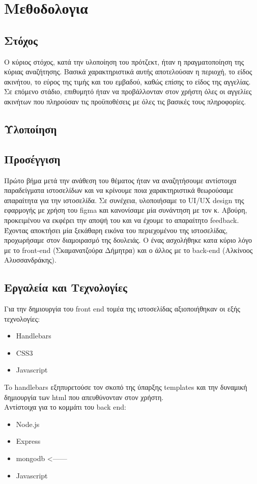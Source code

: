 \documentclass{acmart}
\begin{document}
\section{Μεθοδολογια}
\subsection{Στόχος}
Ο κύριος στόχος, κατά την υλοποίηση του πρότζεκτ, ήταν η πραγματοποίηση της κύριας αναζήτησης. Βασικά χαρακτηριστικά αυτής αποτελούσαν η περιοχή, το είδος ακινήτου, το εύρος της τιμής και του εμβαδού, καθώς επίσης το είδος της αγγελίας. Σε επόμενο στάδιο, επιθυμητό ήταν να προβάλλονταν στον χρήστη όλες οι αγγελίες ακινήτων που πληρούσαν τις προϋποθέσεις με όλες τις βασικές τους πληροφορίες.

\subsection{Υλοποίηση}
\subsection*{Προσέγγιση}
Πρώτο βήμα μετά την ανάθεση του θέματος ήταν να αναζητήσουμε αντίστοιχα παραδείγματα ιστοσελίδων και να κρίνουμε ποια χαρακτηριστικά θεωρούσαμε απαραίτητα για την ιστοσελίδα. Σε συνέχεια, υλοποιήσαμε το UI/UX design της εφαρμογής με χρήση του figma και κανονίσαμε μία συνάντηση με τον κ. Αβούρη, προκειμένου να εκφέρει την αποψή του και να έχουμε το απαραίτητο feedback. Έχοντας αποκτήσει μία ξεκάθαρη εικόνα του περιεχομένου της ιστοσελίδας, προχωρήσαμε στον διαμοιρασμό της δουλειάς. Ο ένας ασχολήθηκε κατα κύριο λόγο με το front-end (Σκαμανατζούρα Δήμητρα) και ο άλλος με το back-end (Αλκίνοος Αλυσσανδράκης).

\subsection*{Εργαλεία και Τεχνολογίες}
Για την δημιουργία του front end τομέα της ιστοσελίδας αξιοποιήθηκαν οι εξής τεχνολογίες:
\begin{itemize}
       \item Handlebars
       \item CSS3
       \item Javascript
\end{itemize}
To handlebars εξηπυρετούσε τον σκοπό της ύπαρξης templates και την δυναμική δημιουργία των html που απευθύνονταν στον χρήστη.\\
Αντίστοιχα για το κομμάτι του back end:
\begin{itemize}
       \item Node.js
       \item Express
       \item mongodb <------
       \item Javascript
\end{itemize}
\end{document}
